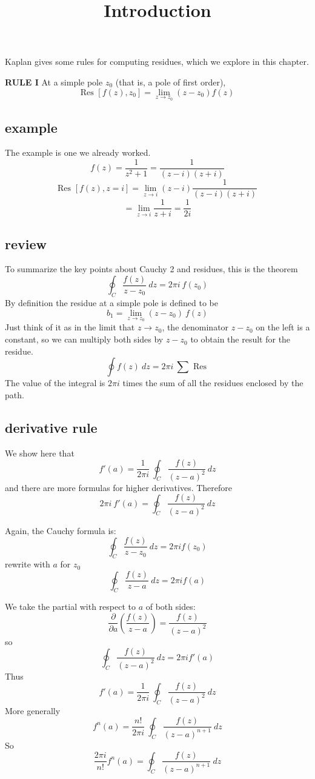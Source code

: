 \documentclass[11pt, oneside]{article}
\title{Introduction}
\date{}
\begin{document}
\maketitle
\Large


Kaplan gives some rules for computing residues, which we explore in this chapter.

\textbf{RULE I}  At a simple pole $z_0$ (that is, a pole of first order),
\[ \text{Res } [f(z),z_0] = \lim_{z \rightarrow z_0} (z-z_0) f(z) \]

\subsection*{example}
The example is one we already worked.
\[ f(z) = \frac{1}{z^2 + 1} = \frac{1}{(z - i)(z + i)} \]
\[ \text{Res } [f(z),z=i] = \lim_{z \rightarrow i} (z-i) \frac{1}{(z - i)(z + i)} \]
\[ = \lim_{z \rightarrow i} \frac{1}{z + i} = \frac{1}{2i} \]

\subsection*{review}

To summarize the key points about Cauchy 2 and residues, this is the theorem
\[ \oint_C \frac{f(z)}{z - z_0} \ dz = 2 \pi i \ f(z_0) \]
By definition the residue at a simple pole is defined to be
\[ b_1 = \lim_{z \rightarrow z_0} (z-z_0) \ f(z)  \]
Just think of it as in the limit that $z \rightarrow z_0$, the denominator $z-z_0$ on the left is a constant, so we can multiply both sides by $z - z_0$ to obtain the result for the residue.
\[ \oint f(z) \ dz = 2 \pi i \ \sum \text{ Res } \]
The value of the integral is $2 \pi i$ times the sum of all the residues enclosed by the path.

\subsection*{derivative rule}

We show here that
\[ f'(a) = \frac{1}{2 \pi i} \ \oint_C \frac{f(z)}{(z-a)^2} \ dz \]
and there are more formulas for higher derivatives.
Therefore
\[ 2 \pi i \ f'(a) =  \oint_C \frac{f(z)}{(z-a)^2} \ dz \]

Again, the Cauchy formula is:
\[ \oint_C \frac{f(z)}{z-z_0} \ dz = 2 \pi i f(z_0) \]
rewrite with $a$ for $z_0$
\[ \oint_C \frac{f(z)}{z-a} \ dz = 2 \pi i f(a) \]

We take the partial with respect to $a$ of both sides:
\[ \frac{\partial}{\partial a} ( \frac{f(z)}{z-a} ) = \frac{f(z)}{(z-a)^2} \]
so
\[ \oint_C \frac{f(z)}{(z-a)^2} \ dz = 2 \pi i f'(a) \]
Thus
\[ f'(a) = \frac{1}{2 \pi i} \ \oint_C \frac{f(z)}{(z-a)^2} \ dz \]
More generally
\[ f^n(a) = \frac{n!}{2 \pi i} \ \oint_C \frac{f(z)}{(z-a)^{n+1}} \ dz \]
So
\[ \frac{2 \pi i}{n!} f^n(a) = \oint_C \frac{f(z)}{(z-a)^{n+1}} \ dz \]
\end{document}
